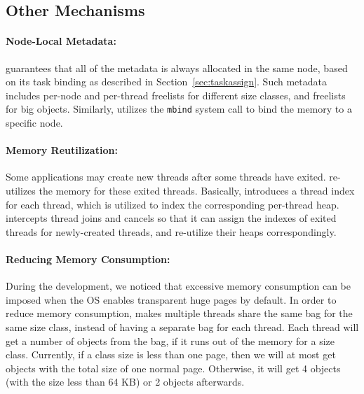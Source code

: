 \subsection{Other Mechanisms}

\paragraph{Node-Local Metadata:} \NM{} guarantees that all of the metadata is always allocated in the same node, based on its task binding as described in Section~\ref{sec:taskassign}. Such metadata includes per-node and per-thread freelists for different size classes, and freelists for big objects. Similarly, \NM{} utilizes the \texttt{mbind} system call to bind the memory to a specific node.  

\paragraph{Memory Reutilization:} Some applications may create new threads after some threads have exited. \NM{} re-utilizes the memory for these exited threads. Basically, \NM{} introduces a thread index for each thread, which is utilized to index the corresponding per-thread heap.  \NM{} intercepts thread joins and cancels so that it can assign the indexes of exited threads for newly-created threads, and re-utilize their heaps correspondingly.  


\paragraph{Reducing Memory Consumption:} During the development, we noticed that excessive memory consumption can be imposed when the OS enables transparent huge pages by default. In order to reduce memory consumption, \NM{} makes multiple threads share the same bag for the same size class, instead of having a separate bag for each thread. Each thread will get a number of objects from the  bag, if it runs out of the memory for a size class. Currently, if a class size is less than one page, then we will at most get objects with the total size of one normal page. Otherwise, it will get 4 objects (with the size less than 64 KB) or 2 objects afterwards.  


 

